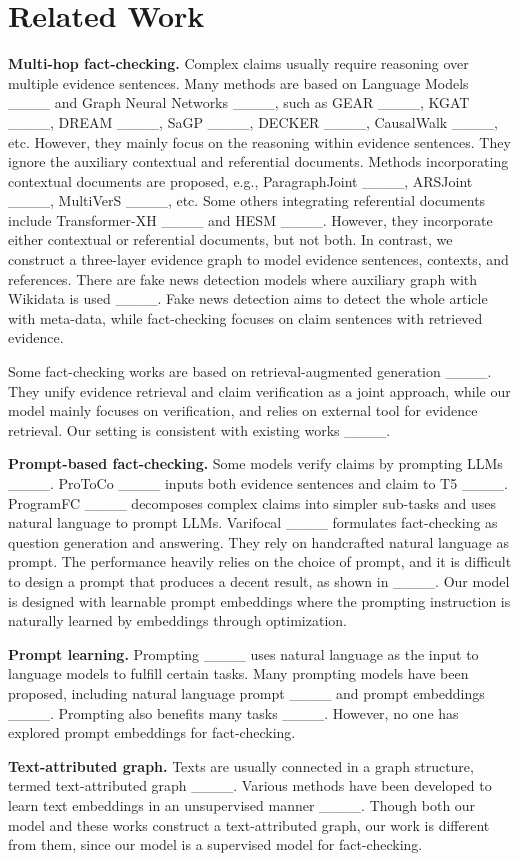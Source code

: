 \section{Related Work}
\textbf{Multi-hop fact-checking.} Complex claims usually require reasoning over multiple evidence sentences. Many methods are based on Language Models ____ and Graph Neural Networks ____, such as GEAR ____, KGAT ____, DREAM ____, SaGP ____, DECKER ____, CausalWalk ____, etc. However, they mainly focus on the reasoning within evidence sentences. They ignore the auxiliary contextual and referential documents. Methods incorporating contextual documents are proposed, e.g., ParagraphJoint ____, ARSJoint ____, MultiVerS ____, etc. Some others integrating referential documents include Transformer-XH ____ and HESM ____. However, they incorporate either contextual or referential documents, but not both. In contrast, we construct a three-layer evidence graph to model evidence sentences, contexts, and references. There are fake news detection models where auxiliary graph with Wikidata is used ____. Fake news detection aims to detect the whole article with meta-data, while fact-checking focuses on claim sentences with retrieved evidence.

Some fact-checking works are based on retrieval-augmented generation ____. They unify evidence retrieval and claim verification as a joint approach, while our model mainly focuses on verification, and relies on external tool for evidence retrieval. Our setting is consistent with existing works ____.

\textbf{Prompt-based fact-checking.} Some models verify claims by prompting LLMs ____. ProToCo ____ inputs both evidence sentences and claim to T5 ____. ProgramFC ____ decomposes complex claims into simpler sub-tasks and uses natural language to prompt LLMs. Varifocal ____ formulates fact-checking as question generation and answering. They rely on handcrafted natural language as prompt. The performance heavily relies on the choice of prompt, and it is difficult to design a prompt that produces a decent result, as shown in ____. Our model is designed with learnable prompt embeddings where the prompting instruction is naturally learned by embeddings through optimization.

\textbf{Prompt learning.} Prompting ____ uses natural language as the input to language models to fulfill certain tasks. Many prompting models have been proposed, including natural language prompt ____ and prompt embeddings ____. Prompting also benefits many tasks ____. However, no one has explored prompt embeddings for fact-checking.

\textbf{Text-attributed graph.} Texts are usually connected in a graph structure, termed text-attributed graph ____. Various methods have been developed to learn text embeddings in an unsupervised manner ____. Though both our model and these works construct a text-attributed graph, our work is different from them, since our model is a supervised model for fact-checking.